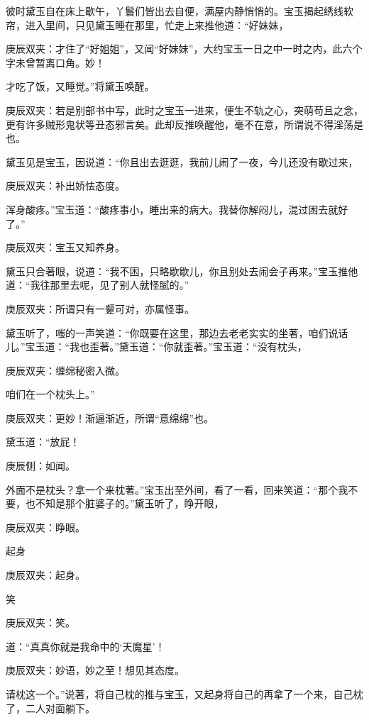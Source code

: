 \begin{parag}
    彼时黛玉自在床上歇午，丫鬟们皆出去自便，满屋内静悄悄的。宝玉揭起绣线软帘，进入里间，只见黛玉睡在那里，忙走上来推他道：“好妹妹，\begin{note}庚辰双夹：才住了“好姐姐”，又闻“好妹妹”，大约宝玉一日之中一时之内，此六个字未曾暂离口角。妙！\end{note}才吃了饭，又睡觉。”将黛玉唤醒。\begin{note}庚辰双夹：若是别部书中写，此时之宝玉一进来，便生不轨之心，突萌苟且之念，更有许多贼形鬼状等丑态邪言矣。此却反推唤醒他，毫不在意，所谓说不得淫荡是也。\end{note}黛玉见是宝玉，因说道：“你且出去逛逛，我前儿闹了一夜，今儿还没有歇过来，\begin{note}庚辰双夹：补出娇怯态度。\end{note}浑身酸疼。”宝玉道：“酸疼事小，睡出来的病大。我替你解闷儿，混过困去就好了。”\begin{note}庚辰双夹：宝玉又知养身。\end{note}黛玉只合著眼，说道：“我不困，只略歇歇儿，你且别处去闹会子再来。”宝玉推他道：“我往那里去呢，见了别人就怪腻的。”\begin{note}庚辰双夹：所谓只有一颦可对，亦属怪事。\end{note}
\end{parag}


\begin{parag}
    黛玉听了，嗤的一声笑道：“你既要在这里，那边去老老实实的坐著，咱们说话儿。”宝玉道：“我也歪著。”黛玉道：“你就歪著。”宝玉道：“没有枕头，\begin{note}庚辰双夹：缠绵秘密入微。\end{note}咱们在一个枕头上。”\begin{note}庚辰双夹：更妙！渐逼渐近，所谓“意绵绵”也。\end{note}黛玉道：“放屁！\begin{note}庚辰侧：如闻。\end{note}外面不是枕头？拿一个来枕著。”宝玉出至外间，看了一看，回来笑道：“那个我不要，也不知是那个脏婆子的。”黛玉听了，睁开眼，\begin{note}庚辰双夹：睁眼。\end{note}起身\begin{note}庚辰双夹：起身。\end{note}笑\begin{note}庚辰双夹：笑。\end{note}道：“真真你就是我命中的‘天魔星’！\begin{note}庚辰双夹：妙语，妙之至！想见其态度。\end{note}请枕这一个。”说著，将自己枕的推与宝玉，又起身将自己的再拿了一个来，自己枕了，二人对面躺下。
\end{parag}


